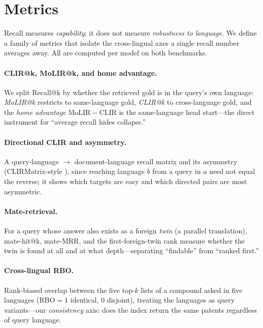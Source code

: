 \documentclass[11pt]{article}
\begin{document}
\section{Metrics}
\label{sec:metrics}

Recall measures \emph{capability}; it does not measure \emph{robustness to
language}. We define a family of metrics that isolate the cross-lingual axes a
single recall number averages away. All are computed per model on both
benchmarks.

\paragraph{CLIR@k, MoLIR@k, and home advantage.}
We split Recall@k by whether the retrieved gold is in the query's own language:
\emph{MoLIR@k} restricts to same-language gold, \emph{CLIR@k} to cross-language
gold, and the \emph{home advantage} $\mathrm{MoLIR}{-}\mathrm{CLIR}$ is the
same-language head start---the direct instrument for ``average recall hides
collapse.''

\paragraph{Directional CLIR and asymmetry.}
A query-language $\rightarrow$ document-language recall matrix and its asymmetry
(CLIRMatrix-style \citep{clirmatrix2020}), since reaching language $b$ from a
query in $a$ need not equal the reverse; it shows which targets are easy and
which directed pairs are most asymmetric.

\paragraph{Mate-retrieval.}
For a query whose answer also exists as a foreign \emph{twin} (a parallel
translation), mate-hit@k, mate-MRR, and the first-foreign-twin rank measure
whether the twin is found at all and at what depth---separating ``findable'' from
``ranked first.''

\paragraph{Cross-lingual RBO.}
Rank-biased overlap \citep{rbo2010} between the five top-$k$ lists of a compound
asked in five languages (RBO$=1$ identical, $0$ disjoint), treating the
languages as query variants---our \emph{consistency} axis: does the index return
the same patents regardless of query language.
\end{document}
